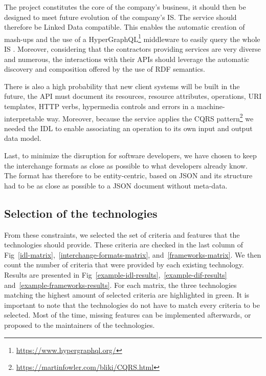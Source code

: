 The project constitutes the core of the company's business, it should then be designed to meet future evolution of the company's IS. 
The service should therefore be Linked Data compatible. This enables the automatic creation of mash-ups and the use of a HyperGraphQL\footnote{\url{https://www.hypergraphql.org/}} middleware to easily query the whole IS \cite{Tuchinda:2011:BMD:1993053.1993058}.
Moreover, considering that the contractors providing services are very diverse and numerous, the interactions with their APIs should leverage the automatic discovery and composition offered by the use of RDF semantics.

There is also a high probability that new client systems will be built in the future, the API must document its resources, resource attributes, operations, URI templates, HTTP verbs, hypermedia controls and errors in a machine-interpretable way. Moreover, because the service applies the CQRS pattern\footnote{\url{https://martinfowler.com/bliki/CQRS.html}} we needed the IDL to enable associating an operation to its own input and output data model.

Last, to minimize the disruption for software developers, we have chosen to keep the interchange formats  as close as possible to what developers already know. The format has therefore to be entity-centric, based on JSON and its structure had to be as close as possible to a JSON document without meta-data.

\subsection{Selection of the technologies}

From these constraints, we selected the set of criteria and features that the technologies should provide. These criteria are checked  in the last column  of Fig~\ref{idl-matrix},~\ref{interchange-formats-matrix}, and~\ref{frameworks-matrix}. 
We then count the number of criteria that were provided by each existing technology. 
Results are presented in Fig~\ref{example-idl-results},~\ref{example-dif-results} and~\ref{example-frameworks-results}. 
For each matrix, the three technologies matching the highest amount of selected criteria are highlighted in green.
It is important to note that the technologies do not have to match every criteria to be selected.
Most of the time, missing features can be implemented afterwards, or proposed to the maintainers of the technologies.

\vspace*{-0.5cm}

